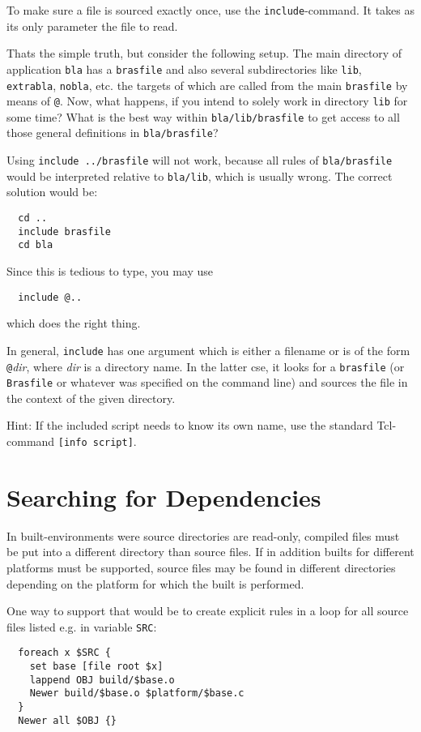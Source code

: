 \documentclass[12pt]{article}
\newcommand{\brasfile}{\texttt{brasfile}}
\newcommand{\Brasfile}{\texttt{Brasfile}}
\begin{document}
To make sure a file is sourced exactly once, use the
\texttt{include}-command. It takes as its only parameter the file to
read. 

Thats the simple truth, but consider the following setup. The main
directory of application \texttt{bla} has a \texttt{brasfile} and also
several subdirectories like \texttt{lib}, \texttt{extrabla},
\texttt{nobla}, etc. the targets of which are called from the main
\texttt{brasfile} by means of \texttt{@}. Now, what happens,
if you intend to solely work in directory \texttt{lib} for some time?
What is the best way within \texttt{bla/lib/brasfile} to get access to all
those general definitions in \texttt{bla/brasfile}?

Using \texttt{include ../brasfile} will not work, because all
rules of \texttt{bla/brasfile} would be interpreted relative to
\texttt{bla/lib}, which is usually wrong. The correct solution would
be:
\begin{verbatim}
  cd ..
  include brasfile
  cd bla
\end{verbatim}
Since this is tedious to type, you may use
\begin{verbatim}
  include @..
\end{verbatim}
which does the right thing.

In general, \texttt{include} has one argument which is either a
filename or is of the form \texttt{@}\textit{dir}, where \textit{dir}
is a directory name. In the latter cse, it looks for a \brasfile{} (or
\Brasfile{} or whatever was specified on the command line) and sources
the file in the context of the given directory.

Hint: If the included script needs to know its own name, use the
standard Tcl-command \texttt{[info script]}.
\section{Searching for Dependencies}
\label{secSearchPath}

In built-environments were source directories are read-only, compiled
files must be put into a different directory than source files. If in
addition builts for different platforms must be supported, source
files may be found in different directories depending on the platform
for which the built is performed.

One way to support that would be to create explicit rules in a loop
for all source files listed e.g. in variable \texttt{SRC}:
\begin{verbatim}
  foreach x $SRC {
    set base [file root $x]
    lappend OBJ build/$base.o
    Newer build/$base.o $platform/$base.c
  }
  Newer all $OBJ {}
\end{verbatim}
\end{document}
